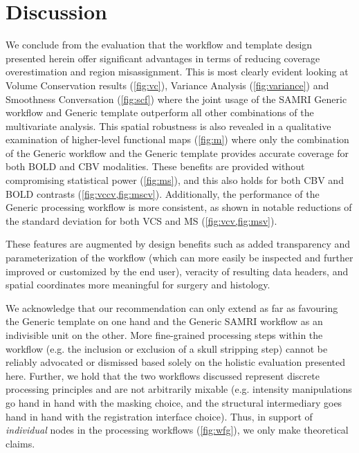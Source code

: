 \section{Discussion}

We conclude from the evaluation that the workflow and template design presented herein offer significant advantages in terms of reducing coverage overestimation and region misassignment.
This is most clearly evident looking at Volume Conservation results (\cref{fig:vc}), Variance Analysis (\cref{fig:variance}) and Smoothness Conversation (\cref{fig:scf}) where the joint usage of the SAMRI Generic workflow and Generic template outperform all other combinations of the multivariate analysis.
This spatial robustness is also revealed in a qualitative examination of higher-level functional maps (\cref{fig:m}) where only the combination of the Generic workflow and the Generic template provides accurate coverage for both BOLD and CBV modalities.
These benefits are provided without compromising statistical power (\cref{fig:ms}), and this also holds for both CBV and BOLD contrasts (\cref{fig:vccv,fig:mscv}).
Additionally, the performance of the Generic processing workflow is more consistent, as shown in notable reductions of the standard deviation for both VCS and MS (\cref{fig:vcv,fig:msv}).

These features are augmented by design benefits such as added transparency and parameterization of the workflow (which can more easily be inspected and further improved or customized by the end user), veracity of resulting data headers, and spatial coordinates more meaningful for surgery and histology.


We acknowledge that our recommendation can only extend as far as favouring the Generic template on one hand and the Generic SAMRI workflow as an indivisible unit on the other.
More fine-grained processing steps within the workflow (e.g. the inclusion or exclusion of a skull stripping step) cannot be reliably advocated or dismissed based solely on the holistic evaluation presented here.
Further, we hold that the two workflows discussed represent discrete processing principles and are not arbitrarily mixable (e.g. intensity manipulations go hand in hand with the masking choice, and the structural intermediary goes hand in hand with the registration interface choice).
Thus, in support of \textit{individual} nodes in the processing workflows (\cref{fig:wfg}), we only make theoretical claims.

